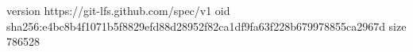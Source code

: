 version https://git-lfs.github.com/spec/v1
oid sha256:e4bc8b4f1071b5f8829efd88d28952f82ca1df9fa63f228b679978855ca2967d
size 786528
